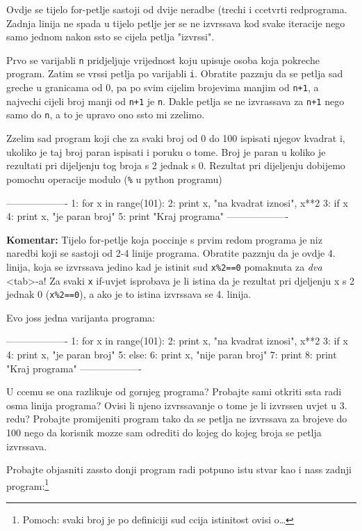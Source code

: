 Ovdje se tijelo for-petlje sastoji od dvije neradbe (trechi i
ccetvrti redprograma. Zadnja linija ne spada u tijelo petlje jer
se ne izvrssava kod svake iteracije nego samo jednom nakon ssto se
cijela petlja "izvrssi".

Prvo se varijabli \verb"n" pridjeljuje vrijednost koju upisuje
osoba koja pokreche program. Zatim se vrssi petlja po varijabli
\verb"i". Obratite pazznju da se petlja sad greche u granicama od
0, pa po svim cijelim brojevima manjim od \verb"n+1", a najvechi
cijeli broj manji od \verb"n+1" je \verb"n". Dakle petlja se ne
izvrassava za \verb"n+1" nego samo do \verb"n", a to je upravo ono
ssto mi zzelimo.

Zzelim sad program koji che za svaki broj od 0 do 100 ispisati
njegov kvadrat i, ukoliko je taj broj paran ispisati i poruku o
tome. Broj je paran u koliko je rezultati pri dijeljenju tog broja
s 2 jednak s 0. Rezultat pri dijeljenju dobijemo pomochu operacije
modulo (\verb"%" u python programu)

-------------------
1: for x in range(101):
2: 	print x, "na kvadrat iznosi", x**2
3: 	if x %
4: 		print x, "je paran broj"
5: print "Kraj programa"
-------------------

\textbf{Komentar:} Tijelo for-petlje koja poccinje s prvim redom
programa je niz naredbi koji se sastoji od 2-4 linije programa.
Obratite pazznju da je ovdje 4. linija, koja se izvrssava jedino
kad je istinit sud \verb"x%2==0" pomaknuta za \emph{dva} <tab>-a!
Za svaki \verb"x" if-uvjet isprobava je li istina da je rezultat
pri djeljenju x s 2 jednak 0 (\verb"x%2==0"), a ako je to istina
izvrssava se 4. linija.

Evo joss jedna varijanta programa:

-------------------
1: for x in range(101):
2: 	print x, "na kvadrat iznosi", x**2
3: 	if x %
4: 		print x, "je paran broj"
5:		else:
6: 		print x, "nije paran broj"
7: 	print
8: print "Kraj programa"
-------------------

U ccemu se ona razlikuje od gornjeg programa? Probajte sami otkriti ssta
radi osma linija programa? Ovisi li njeno izvrssavanje o tome je li
izvrssen uvjet u 3. redu? Probajte promijeniti program tako da se petlja ne
izvrssava za brojeve do 100 nego da korisnik mozze sam odrediti do kojeg do
kojeg broja se petlja izvrssava.

Probajte objasniti zassto donji program radi potpuno istu stvar
kao i nass zadnji program:\footnote{Pomoch: svaki broj je po definiciji sud
ccija istinitost ovisi o\dots}

